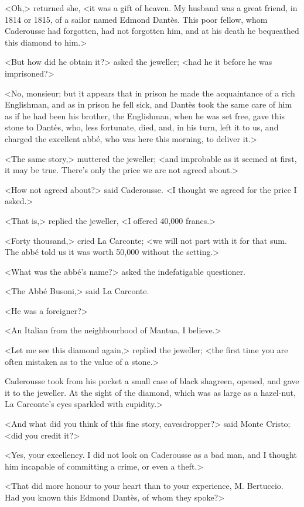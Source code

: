{<Oh,> returned she, <it was a gift of heaven. My husband was a great friend, in 1814 or 1815, of a sailor named Edmond Dantès. This poor fellow, whom Caderousse had forgotten, had not forgotten him, and at his death he bequeathed this diamond to him.> 

<But how did he obtain it?> asked the jeweller; <had he it before he was imprisoned?> 

<No, monsieur; but it appears that in prison he made the acquaintance of a rich Englishman, and as in prison he fell sick, and Dantès took the same care of him as if he had been his brother, the Englishman, when he was set free, gave this stone to Dantès, who, less fortunate, died, and, in his turn, left it to us, and charged the excellent abbé, who was here this morning, to deliver it.> 

<The same story,> muttered the jeweller; <and improbable as it seemed at first, it may be true. There's only the price we are not agreed about.> 

<How not agreed about?> said Caderousse. <I thought we agreed for the price I asked.> 

<That is,> replied the jeweller, <I offered 40,000 francs.> 

<Forty thousand,> cried La Carconte; <we will not part with it for that sum. The abbé told us it was worth 50,000 without the setting.> 

<What was the abbé's name?> asked the indefatigable questioner. 

<The Abbé Busoni,> said La Carconte. 

<He was a foreigner?> 

<An Italian from the neighbourhood of Mantua, I believe.> 

<Let me see this diamond again,> replied the jeweller; <the first time you are often mistaken as to the value of a stone.> 

Caderousse took from his pocket a small case of black shagreen, opened, and gave it to the jeweller. At the sight of the diamond, which was as large as a hazel-nut, La Carconte's eyes sparkled with cupidity.>}

 <And what did you think of this fine story, eavesdropper?> said Monte Cristo; <did you credit it?> 

 <Yes, your excellency. I did not look on Caderousse as a bad man, and I thought him incapable of committing a crime, or even a theft.> 

 <That did more honour to your heart than to your experience, M. Bertuccio. Had you known this Edmond Dantès, of whom they spoke?> 

